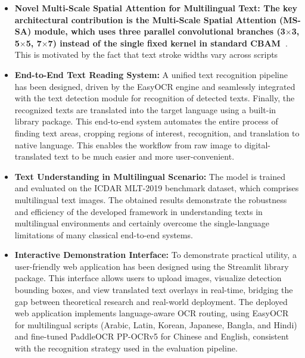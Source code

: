 \documentclass{ieeeaccess}
\begin{document}
\begin{itemize}
  \item \textbf{Novel Multi-Scale Spatial Attention for Multilingual Text: The key architectural contribution is the Multi-Scale Spatial Attention (MS-SA) module, which uses three parallel convolutional branches (3$\times$3, 5$\times$5, 7$\times$7) instead of the single fixed kernel in standard CBAM~}\cite{b33}. This is motivated by the fact that text stroke widths vary across scripts 

  \item \textbf{End-to-End Text Reading System:} A unified text recognition pipeline has been designed, driven by the EasyOCR engine and seamlessly integrated with the text detection module for recognition of detected texts. Finally, the recognized texts are translated into the target language using a built-in library package. This end-to-end system automates the entire process of finding text areas, cropping regions of interest, recognition, and translation to native language. This enables the workflow from raw image to digital-translated text to be much easier and more user-convenient.

  \item \textbf{Text Understanding in Multilingual Scenario:} The model is trained and evaluated on the ICDAR MLT-2019 benchmark dataset, which comprises multilingual text images. The obtained results demonstrate the robustness and efficiency of the developed framework in understanding texts in multilingual environments and certainly overcome the single-language limitations of many classical end-to-end systems.

  \item \textbf{Interactive Demonstration Interface:} To demonstrate practical utility, a user-friendly web application has been designed using the Streamlit library package. This interface allows users to upload images, visualize detection bounding boxes, and view translated text overlays in real-time, bridging the gap between theoretical research and real-world deployment. The deployed web application implements language-aware OCR routing, using EasyOCR for multilingual scripts (Arabic, Latin, Korean, Japanese, Bangla, and Hindi) and fine-tuned PaddleOCR PP-OCRv5 for Chinese and English, consistent with the recognition strategy used in the evaluation pipeline.
\end{itemize}
\end{document}
